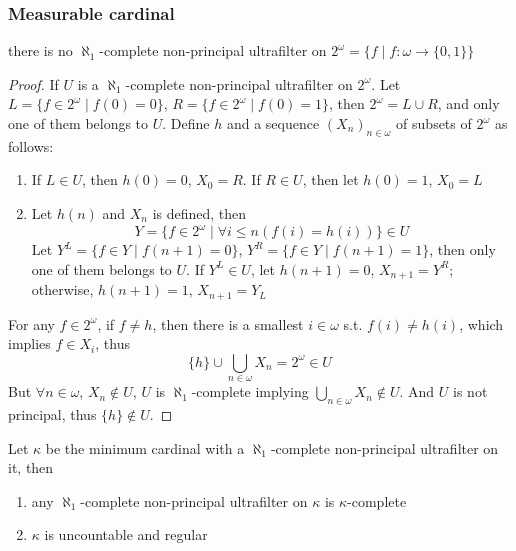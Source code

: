 \documentclass[11pt]{article}
\begin{document}
\subsubsection{Measurable cardinal}
\label{sec:orgf843bd4}
\begin{lemma}[]
there is no \(\aleph_1\)-complete non-principal ultrafilter on \(2^\omega=\{f\mid f:\omega\to\{0,1\}\}\)
\end{lemma}

\begin{proof}
If \(U\) is a \(\aleph_1\)-complete non-principal ultrafilter on \(2^\omega\).
Let \(L=\{f\in 2^\omega\mid f(0)=0\}\), \(R=\{f\in 2^\omega\mid f(0)=1\}\), then \(2^\omega=L\cup R\), and only one of them
belongs to \(U\). Define \(h\) and a sequence \((X_n)_{n\in\omega}\) of subsets of \(2^\omega\) as follows:
\begin{enumerate}
\item If \(L\in U\), then \(h(0)=0\), \(X_0=R\). If \(R\in U\), then let \(h(0)=1\), \(X_0=L\)
\item Let \(h(n)\) and \(X_n\) is defined, then
\begin{equation*}
Y=\{f\in 2^\omega\mid\forall i\le n(f(i)=h(i))\}\in U
\end{equation*}
Let \(Y^L=\{f\in Y\mid f(n+1)=0\}\), \(Y^R=\{f\in Y\mid f(n+1)=1\}\), then only one of them belongs to \(U\).
If \(Y^L\in U\), let \(h(n+1)=0\), \(X_{n+1}=Y^R\); otherwise, \(h(n+1)=1\), \(X_{n+1}=Y_L\)
\end{enumerate}


For any \(f\in 2^\omega\), if \(f\neq h\), then there is a smallest \(i\in\omega\) s.t. \(f(i)\neq h(i)\), which
implies \(f\in X_i\), thus
\begin{equation*}
\{h\}\cup\bigcup_{n\in\omega}X_n=2^\omega\in U
\end{equation*}
But \(\forall n\in\omega\), \(X_n\notin U\), \(U\) is \(\aleph_1\)-complete implying \(\bigcup_{n\in\omega}X_n\notin U\).
And \(U\) is not principal, thus \(\{h\}\notin U\).
\end{proof}

\begin{lemma}[]
Let \(\kappa\) be the minimum cardinal with a \(\aleph_1\)-complete non-principal ultrafilter on it, then
\begin{enumerate}
\item any \(\aleph_1\)-complete non-principal ultrafilter on \(\kappa\) is \(\kappa\)-complete
\item \(\kappa\) is uncountable and regular
\end{enumerate}
\end{lemma}
\end{document}
